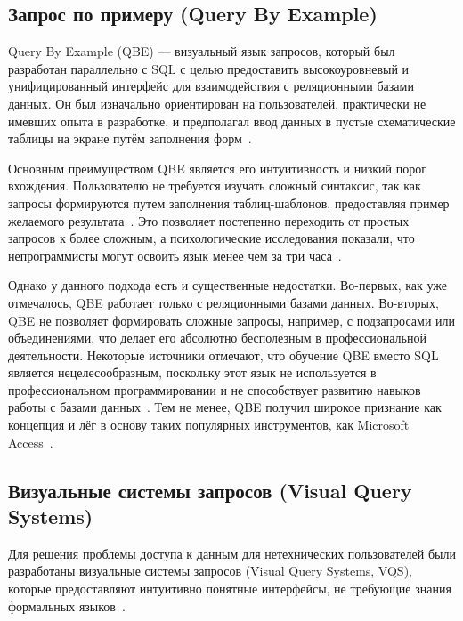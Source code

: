 \subsection{Запрос по примеру (Query By Example)}

Query By Example (QBE) --- визуальный язык запросов, который был разработан параллельно с SQL с целью
предоставить высокоуровневый и унифицированный интерфейс для взаимодействия с реляционными
базами данных. Он был изначально ориентирован на пользователей,
практически не имевших опыта в разработке, и предполагал ввод данных в пустые
схематические таблицы на экране путём заполнения
форм~\cite{maranAlternativeApproachesData2020, zloofQuerybyexampleDataBase1977}.

Основным преимуществом QBE является его интуитивность и низкий порог вхождения.
Пользователю не требуется изучать сложный синтаксис,
так как запросы формируются путем заполнения таблиц-шаблонов,
предоставляя пример желаемого результата~\cite{catarciVisualQuerySystems1997,zloofQuerybyexampleDataBase1977}.
Это позволяет постепенно переходить от простых запросов к более сложным,
а психологические исследования показали, что непрограммисты могут освоить язык менее
чем за три часа~\cite{zloofQuerybyexampleDataBase1977}.

Однако у данного подхода есть и существенные недостатки.
Во-первых, как уже отмечалось, QBE работает только с реляционными базами данных.
Во-вторых, QBE не позволяет формировать сложные запросы, например, с подзапросами или объединениями,
что делает его абсолютно бесполезным в профессиональной деятельности.
Некоторые источники отмечают, что обучение QBE вместо SQL является нецелесообразным,
поскольку этот язык не используется в профессиональном программировании и
не способствует развитию навыков работы с
базами данных~\cite{pirogovNekotoryeOsobennostiPrepodavaniya2018}.
Тем не менее, QBE получил широкое признание как концепция и лёг в основу таких
популярных инструментов, как Microsoft Access~\cite{maranAlternativeApproachesData2020}.




\subsection{Визуальные системы запросов (Visual Query Systems)}

Для решения проблемы доступа
к данным для нетехнических пользователей были разработаны визуальные
системы запросов (Visual Query Systems, VQS), которые предоставляют интуитивно понятные интерфейсы,
не требующие знания формальных языков~\cite{catarciVisualQuerySystems1996,
      catarciVisualQuerySystems1997, baskaranSyntaticSemanticVisual2013}.

